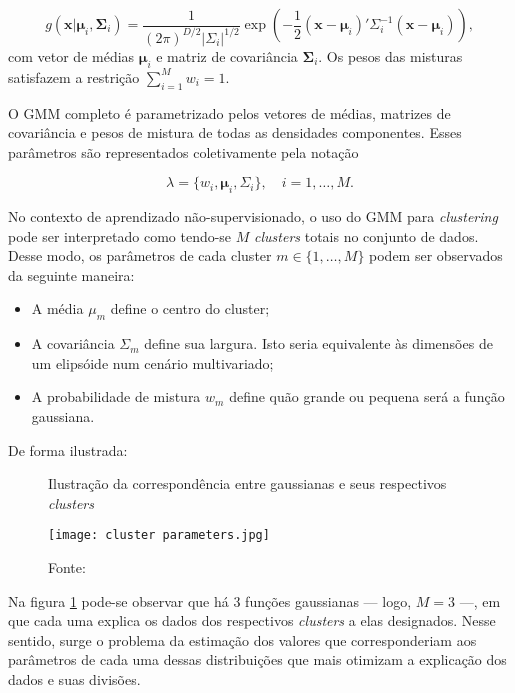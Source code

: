 \documentclass[12pt]{article}
\begin{document}
\begin{equation}
g(\mathbf{x}|\mathbf{\mu}_i, \mathbf{\Sigma}_i) = \frac{1}{(2\pi)^{D/2}|\Sigma_i|^{1/2}} \exp\left(-\frac{1}{2}(\mathbf{x}-\mathbf{\mu}_i)'\Sigma_i^{-1}(\mathbf{x}-\mathbf{\mu}_i)\right),
\end{equation}
com vetor de médias $\mathbf{\mu}_i$ e matriz de covariância $\mathbf{\Sigma}_i$. Os pesos das misturas satisfazem a restrição $\sum_{i=1}^{M} w_i = 1$.

O GMM completo é parametrizado pelos vetores de médias, matrizes de covariância e pesos de mistura de todas as densidades componentes. Esses parâmetros são representados coletivamente pela notação

\begin{equation}
\lambda = \{w_i, \mathbf{\mu}_i, \Sigma_i\}, \quad i = 1, \ldots, M.
\end{equation}

No contexto de aprendizado não-supervisionado, o uso do GMM para \textit{clustering} pode ser interpretado como tendo-se $M$ \textit{clusters} totais no conjunto de dados. Desse modo, os parâmetros de cada cluster $m \in \{1, \ldots, M\}$ podem ser observados da seguinte maneira:

\begin{itemize}
    \item A média $\mu_m$ define o centro do cluster;
    \item A covariância $\Sigma_m$ define sua largura. Isto seria equivalente às dimensões de um elipsóide num cenário multivariado;
    \item A probabilidade de mistura $w_m$ define quão grande ou pequena será a função gaussiana.
\end{itemize}

De forma ilustrada:

\begin{figure}[H]
    \centering
    \caption{Ilustração da correspondência entre gaussianas e seus respectivos \textit{clusters}}
    \texttt{[image: cluster parameters.jpg]}
    \caption*{Fonte: \cite{carrascoweb}}\label{fig1}
\end{figure}

Na figura \ref{fig1} pode-se observar que há 3 funções gaussianas — logo, $M = 3$ —, em que cada uma explica os dados dos respectivos \textit{clusters} a elas designados. Nesse sentido, surge o problema da estimação dos valores que corresponderiam aos parâmetros de cada uma dessas distribuições que mais otimizam a explicação dos dados e suas divisões.
\end{document}
